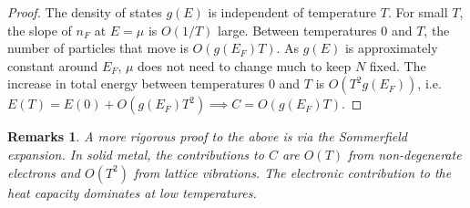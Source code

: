 \documentclass[a4paper]{article}
\newtheorem{remarks}{Remarks}[section]
\theoremstyle{new}
\begin{document}
\begin{proof}
The density of states $g(E)$ is independent of temperature $T$. For small $T$, the slope of $n_F$ at $E=\mu$ is $O(1/T)$ large. Between temperatures 0 and $T$, the number of particles that move is $O(g(E_F)T)$. As $g(E)$ is approximately constant around $E_F$, $\mu$ does not need to change much to keep $N$ fixed. The increase in total energy between temperatures 0 and $T$ is $O(T^2g(E_F))$, i.e. $E(T)=E(0)+O(g(E_F)T^2)\implies C=O(g(E_F)T)$. 
\end{proof}
\begin{center}
\end{center}
\begin{remarks}
A more rigorous proof to the above is via the Sommerfield expansion. In solid metal, the contributions to $C$ are $O(T)$ from non-degenerate electrons and $O(T^2)$ from lattice vibrations. The electronic contribution to the heat capacity dominates at low temperatures.
\end{remarks}
\newpage
\end{document}
